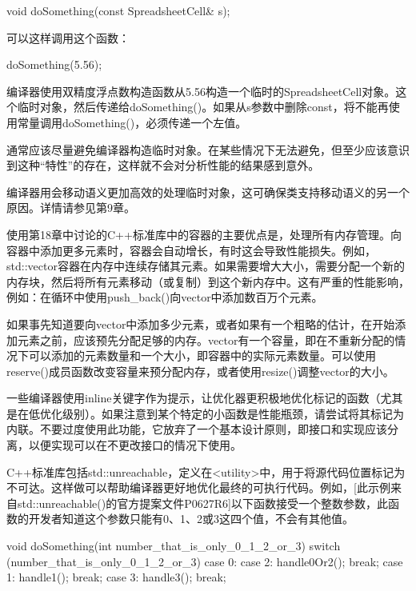 \begin{cpp}
void doSomething(const SpreadsheetCell& s);
\end{cpp}

可以这样调用这个函数：

\begin{cpp}
doSomething(5.56);
\end{cpp}

编译器使用双精度浮点数构造函数从5.56构造一个临时的SpreadsheetCell对象。这个临时对象，然后传递给doSomething()。如果从s参数中删除const，将不能再使用常量调用doSomething()，必须传递一个左值。

通常应该尽量避免编译器构造临时对象。在某些情况下无法避免，但至少应该意识到这种“特性”的存在，这样就不会对分析性能的结果感到意外。

编译器用会移动语义更加高效的处理临时对象，这可确保类支持移动语义的另一个原因。详情请参见第9章。


使用第18章中讨论的C++标准库中的容器的主要优点是，处理所有内存管理。向容器中添加更多元素时，容器会自动增长，有时这会导致性能损失。例如，std::vector容器在内存中连续存储其元素。如果需要增大大小，需要分配一个新的内存块，然后将所有元素移动（或复制）到这个新内存中。这有严重的性能影响，例如：在循环中使用push\_back()向vector中添加数百万个元素。

如果事先知道要向vector中添加多少元素，或者如果有一个粗略的估计，在开始添加元素之前，应该预先分配足够的内存。vector有一个容量，即在不重新分配的情况下可以添加的元素数量和一个大小，即容器中的实际元素数量。可以使用reserve()成员函数改变容量来预分配内存，或者使用resize()调整vector的大小。


一些编译器使用inline关键字作为提示，让优化器更积极地优化标记的函数（尤其是在低优化级别）。如果注意到某个特定的小函数是性能瓶颈，请尝试将其标记为内联。不要过度使用此功能，它放弃了一个基本设计原则，即接口和实现应该分离，以便实现可以在不更改接口的情况下使用。



C++标准库包括std::unreachable，定义在<utility>中，用于将源代码位置标记为不可达。这样做可以帮助编译器更好地优化最终的可执行代码。例如，[此示例来自std::unreachable()的官方提案文件P0627R6]以下函数接受一个整数参数，此函数的开发者知道这个参数只能有0、1、2或3这四个值，不会有其他值。

\begin{cpp}
void doSomething(int number_that_is_only_0_1_2_or_3)
{
    switch (number_that_is_only_0_1_2_or_3) {
        case 0:
        case 2:
            handle0Or2(); break;
        case 1:
            handle1(); break;
        case 3:
            handle3(); break;
    }
}
\end{cpp}

